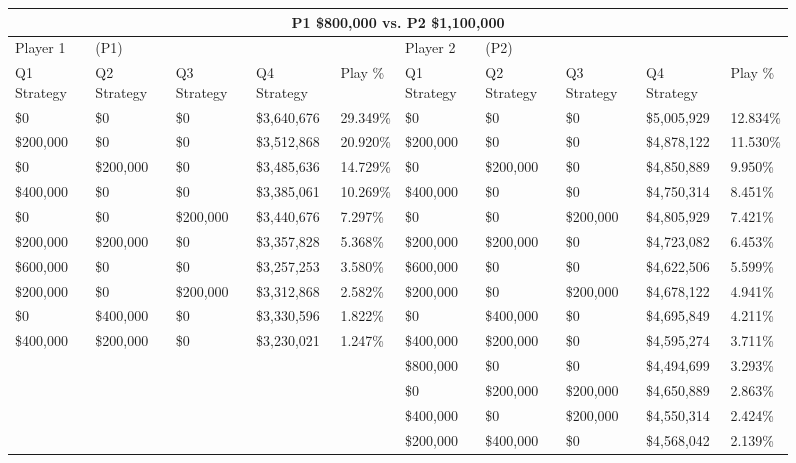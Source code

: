 \documentclass[11pt]{article}
\begin{document}
\begin{figure}
\tiny
\begin{tabular}{ |p{1.0cm}p{1.0cm}p{1.0cm}p{2.0cm}|p{1.0cm}||p{1.0cm}p{1.0cm}p{1.0cm}p{2.0cm}|p{1.0cm}|}
\hline
\multicolumn{10}{|c|}{P1 \$800,000 vs. P2 \$1,100,000} \\
\hline
Player 1 & (P1) & & & & Player 2 & (P2) & & & \\
\hline
Q1 Strategy & Q2 Strategy & Q3 Strategy & Q4 Strategy  &  Play \% & Q1 Strategy & Q2 Strategy & Q3 Strategy & Q4 Strategy  &  Play \%\\
\hline
\$0 & \$0 & \$0 & \$3,640,676 & 29.349\%                    & \$0 & \$0 & \$0 & \$5,005,929 & 12.834\% \\
\$200,000 & \$0 & \$0 & \$3,512,868 & 20.920\%              & \$200,000 & \$0 & \$0 & \$4,878,122 & 11.530\% \\
\$0 & \$200,000 & \$0 & \$3,485,636 & 14.729\%              & \$0 & \$200,000 & \$0 & \$4,850,889 & 9.950\% \\
\$400,000 & \$0 & \$0 & \$3,385,061 & 10.269\%              & \$400,000 & \$0 & \$0 & \$4,750,314 & 8.451\% \\
\$0 & \$0 & \$200,000 & \$3,440,676 & 7.297\%               & \$0 & \$0 & \$200,000 & \$4,805,929 & 7.421\% \\
\$200,000 & \$200,000 & \$0 & \$3,357,828 & 5.368\%         & \$200,000 & \$200,000 & \$0 & \$4,723,082 & 6.453\% \\
\$600,000 & \$0 & \$0 & \$3,257,253 & 3.580\%               & \$600,000 & \$0 & \$0 & \$4,622,506 & 5.599\% \\
\$200,000 & \$0 & \$200,000 & \$3,312,868 & 2.582\%         & \$200,000 & \$0 & \$200,000 & \$4,678,122 & 4.941\% \\
\$0 & \$400,000 & \$0 & \$3,330,596 & 1.822\%               & \$0 & \$400,000 & \$0 & \$4,695,849 & 4.211\% \\
\$400,000 & \$200,000 & \$0 & \$3,230,021 & 1.247\%         & \$400,000 & \$200,000 & \$0 & \$4,595,274 & 3.711\% \\
& & & &                                                     & \$800,000 & \$0 & \$0 & \$4,494,699 & 3.293\% \\
& & & &                                                     & \$0 & \$200,000 & \$200,000 & \$4,650,889 & 2.863\% \\
& & & &                                                     & \$400,000 & \$0 & \$200,000 & \$4,550,314 & 2.424\% \\
& & & &                                                     & \$200,000 & \$400,000 & \$0 & \$4,568,042 & 2.139\% \\

\end{tabular}
\end{figure}
\end{document}
